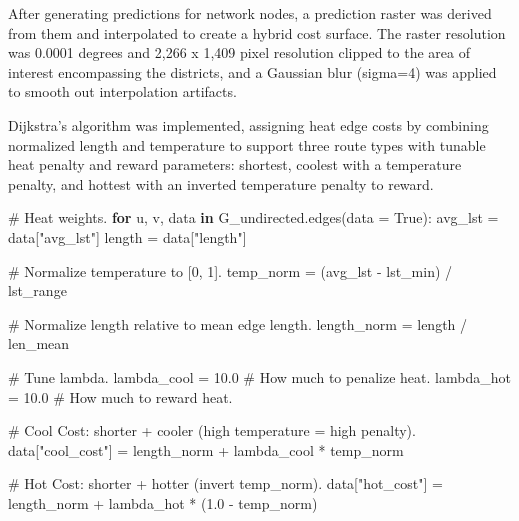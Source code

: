 \documentclass[
]{report}
\newenvironment{Shaded}{\begin{snugshade}}{\end{snugshade}}
\newcommand{\CommentTok}[1]{\textcolor[rgb]{0.37,0.37,0.37}{#1}}
\newcommand{\ControlFlowTok}[1]{\textcolor[rgb]{0.00,0.23,0.31}{\textbf{#1}}}
\newcommand{\FloatTok}[1]{\textcolor[rgb]{0.68,0.00,0.00}{#1}}
\newcommand{\KeywordTok}[1]{\textcolor[rgb]{0.00,0.23,0.31}{\textbf{#1}}}
\newcommand{\NormalTok}[1]{\textcolor[rgb]{0.00,0.23,0.31}{#1}}
\newcommand{\OperatorTok}[1]{\textcolor[rgb]{0.37,0.37,0.37}{#1}}
\newcommand{\StringTok}[1]{\textcolor[rgb]{0.13,0.47,0.30}{#1}}
\newcommand{\VariableTok}[1]{\textcolor[rgb]{0.07,0.07,0.07}{#1}}
\begin{document}
After generating predictions for network nodes, a prediction raster was
derived from them and interpolated to create a hybrid cost surface. The
raster resolution was 0.0001 degrees and 2,266 x 1,409 pixel resolution
clipped to the area of interest encompassing the districts, and a
Gaussian blur (sigma=4) was applied to smooth out interpolation
artifacts.

Dijkstra's algorithm was implemented, assigning heat edge costs by
combining normalized length and temperature to support three route types
with tunable heat penalty and reward parameters: shortest, coolest with
a temperature penalty, and hottest with an inverted temperature penalty
to reward.

\begin{Shaded}
\begin{Highlighting}[]
\CommentTok{\# Heat weights.}
\ControlFlowTok{for}\NormalTok{ u, v, data }\KeywordTok{in}\NormalTok{ G\_undirected.edges(data }\OperatorTok{=} \VariableTok{True}\NormalTok{):}
\NormalTok{    avg\_lst }\OperatorTok{=}\NormalTok{ data[}\StringTok{"avg\_lst"}\NormalTok{]}
\NormalTok{    length  }\OperatorTok{=}\NormalTok{ data[}\StringTok{"length"}\NormalTok{]}

    \CommentTok{\# Normalize temperature to [0, 1].}
\NormalTok{    temp\_norm }\OperatorTok{=}\NormalTok{ (avg\_lst }\OperatorTok{{-}}\NormalTok{ lst\_min) }\OperatorTok{/}\NormalTok{ lst\_range}

    \CommentTok{\# Normalize length relative to mean edge length.}
\NormalTok{    length\_norm }\OperatorTok{=}\NormalTok{ length }\OperatorTok{/}\NormalTok{ len\_mean}

    \CommentTok{\# Tune lambda.}
\NormalTok{    lambda\_cool }\OperatorTok{=} \FloatTok{10.0} \CommentTok{\# How much to penalize heat.}
\NormalTok{    lambda\_hot  }\OperatorTok{=} \FloatTok{10.0} \CommentTok{\# How much to reward heat.}

    \CommentTok{\# Cool Cost: shorter + cooler (high temperature = high penalty).}
\NormalTok{    data[}\StringTok{"cool\_cost"}\NormalTok{] }\OperatorTok{=}\NormalTok{ length\_norm }\OperatorTok{+}\NormalTok{ lambda\_cool }\OperatorTok{*}\NormalTok{ temp\_norm}

    \CommentTok{\# Hot Cost: shorter + hotter (invert temp\_norm).}
\NormalTok{    data[}\StringTok{"hot\_cost"}\NormalTok{] }\OperatorTok{=}\NormalTok{ length\_norm }\OperatorTok{+}\NormalTok{ lambda\_hot }\OperatorTok{*}\NormalTok{ (}\FloatTok{1.0} \OperatorTok{{-}}\NormalTok{ temp\_norm)}
\end{Highlighting}
\end{Shaded}
\end{document}
